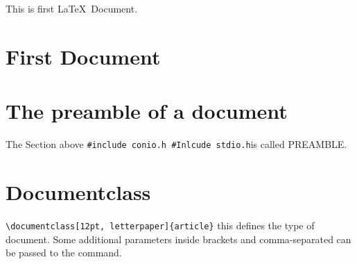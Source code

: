\documentclass{article}
\begin{document}
This is first \LaTeX\ Document. 

\section{First Document}


\section{The preamble of a document} 
The Section above 
\verb|#include conio.h #Inlcude stdio.h|is called PREAMBLE.

\section{Documentclass}
\verb|\documentclass[12pt, letterpaper]{article}|
this defines the type of document. Some additional parameters inside brackets and comma-separated can be passed to the command.
\end{document}
